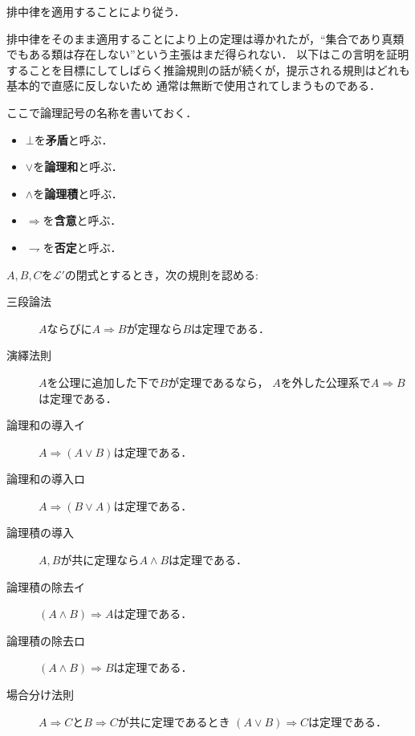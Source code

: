 	\begin{prf}
		排中律を適用することにより従う．
		\QED
	\end{prf}
	
	排中律をそのまま適用することにより上の定理は導かれたが，``集合であり真類でもある類は存在しない''という主張はまだ得られない．
	以下はこの言明を証明することを目標にしてしばらく推論規則の話が続くが，提示される規則はどれも基本的で直感に反しないため
	通常は無断で使用されてしまうものである．
	
	ここで論理記号の名称を書いておく．
	\begin{itemize}
		\item $\bot$を{\bf 矛盾}と呼ぶ．
		\item $\vee$を{\bf 論理和}と呼ぶ．
		\item $\wedge$を{\bf 論理積}と呼ぶ．
		\item $\Longrightarrow$を{\bf 含意}と呼ぶ．
		\item $\rightharpoondown$を{\bf 否定}と呼ぶ．
	\end{itemize}
	
	\begin{screen}
		\begin{logicalaxm}[基本的な推論規則]\label{logicalaxm:fundamental_rules_of_inference}
			$A,B,C$を$\mathcal{L}'$の閉式とするとき，次の規則を認める:
			\begin{description}
				\item[三段論法] $A$ならびに$A \Longrightarrow B$が定理なら$B$は定理である．
				\item[演繹法則] $A$を公理に追加した下で$B$が定理であるなら，
					$A$を外した公理系で$A \Longrightarrow B$は定理である．
				\item[論理和の導入イ] $A \Longrightarrow (A \vee B)$は定理である．
				\item[論理和の導入ロ] $A \Longrightarrow (B \vee A)$は定理である．
				\item[論理積の導入] $A,B$が共に定理なら$A \wedge B$は定理である．
				\item[論理積の除去イ] $(A \wedge B) \Longrightarrow A$は定理である．
				\item[論理積の除去ロ] $(A \wedge B) \Longrightarrow B$は定理である．
				\item[場合分け法則] $A \Longrightarrow C$と$B \Longrightarrow C$が共に定理であるとき
					$(A \vee B) \Longrightarrow C$は定理である．
			\end{description}	
		\end{logicalaxm}
	\end{screen}
	

